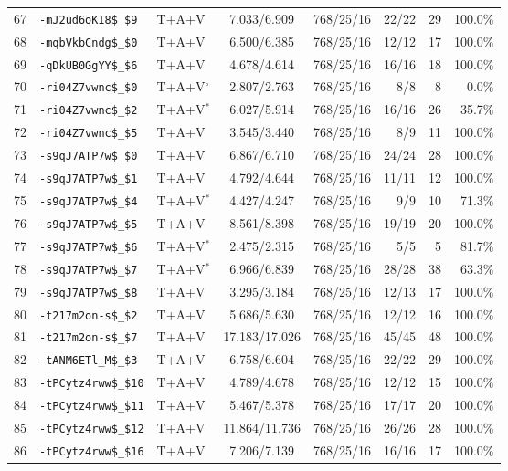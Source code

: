 \begin{table}[!ht]
\begin{tabular}{rllccrrr}
67 & \texttt{-mJ2ud6oKI8\$\_\$9} & T+A+V & 7.033/6.909 & 768/25/16 & 22/22 & 29 & 100.0\% \\
68 & \texttt{-mqbVkbCndg\$\_\$0} & T+A+V & 6.500/6.385 & 768/25/16 & 12/12 & 17 & 100.0\% \\
69 & \texttt{-qDkUB0GgYY\$\_\$6} & T+A+V & 4.678/4.614 & 768/25/16 & 16/16 & 18 & 100.0\% \\
70 & \texttt{-ri04Z7vwnc\$\_\$0} & T+A+V$^{\circ}$ & 2.807/2.763 & 768/25/16 & 8/8 & 8 & 0.0\% \\
71 & \texttt{-ri04Z7vwnc\$\_\$2} & T+A+V$^{*}$ & 6.027/5.914 & 768/25/16 & 16/16 & 26 & 35.7\% \\
72 & \texttt{-ri04Z7vwnc\$\_\$5} & T+A+V & 3.545/3.440 & 768/25/16 & 8/9 & 11 & 100.0\% \\
73 & \texttt{-s9qJ7ATP7w\$\_\$0} & T+A+V & 6.867/6.710 & 768/25/16 & 24/24 & 28 & 100.0\% \\
74 & \texttt{-s9qJ7ATP7w\$\_\$1} & T+A+V & 4.792/4.644 & 768/25/16 & 11/11 & 12 & 100.0\% \\
75 & \texttt{-s9qJ7ATP7w\$\_\$4} & T+A+V$^{*}$ & 4.427/4.247 & 768/25/16 & 9/9 & 10 & 71.3\% \\
76 & \texttt{-s9qJ7ATP7w\$\_\$5} & T+A+V & 8.561/8.398 & 768/25/16 & 19/19 & 20 & 100.0\% \\
77 & \texttt{-s9qJ7ATP7w\$\_\$6} & T+A+V$^{*}$ & 2.475/2.315 & 768/25/16 & 5/5 & 5 & 81.7\% \\
78 & \texttt{-s9qJ7ATP7w\$\_\$7} & T+A+V$^{*}$ & 6.966/6.839 & 768/25/16 & 28/28 & 38 & 63.3\% \\
79 & \texttt{-s9qJ7ATP7w\$\_\$8} & T+A+V & 3.295/3.184 & 768/25/16 & 12/13 & 17 & 100.0\% \\
80 & \texttt{-t217m2on-s\$\_\$2} & T+A+V & 5.686/5.630 & 768/25/16 & 12/12 & 16 & 100.0\% \\
81 & \texttt{-t217m2on-s\$\_\$7} & T+A+V & 17.183/17.026 & 768/25/16 & 45/45 & 48 & 100.0\% \\
82 & \texttt{-tANM6ETl\_M\$\_\$3} & T+A+V & 6.758/6.604 & 768/25/16 & 22/22 & 29 & 100.0\% \\
83 & \texttt{-tPCytz4rww\$\_\$10} & T+A+V & 4.789/4.678 & 768/25/16 & 12/12 & 15 & 100.0\% \\
84 & \texttt{-tPCytz4rww\$\_\$11} & T+A+V & 5.467/5.378 & 768/25/16 & 17/17 & 20 & 100.0\% \\
85 & \texttt{-tPCytz4rww\$\_\$12} & T+A+V & 11.864/11.736 & 768/25/16 & 26/26 & 28 & 100.0\% \\
86 & \texttt{-tPCytz4rww\$\_\$16} & T+A+V & 7.206/7.139 & 768/25/16 & 16/16 & 17 & 100.0\% \\

\end{tabular}
\end{table}
